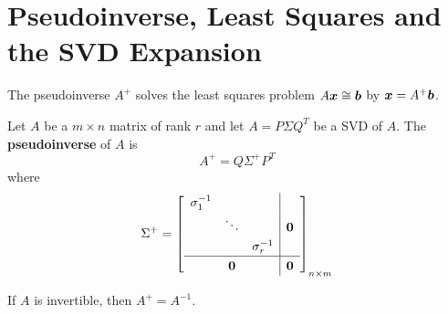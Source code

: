 \section{Pseudoinverse, Least Squares and the SVD Expansion}

\begin{bigidea}
The pseudoinverse $A^+$ solves the least squares problem $A \boldsymbol{x} \cong \boldsymbol{b}$ by $\boldsymbol{x} = A^+ \boldsymbol{b}$.
\end{bigidea}

\begin{definition}
Let $A$ be a $m \times n$ matrix of rank $r$ and let $A = P \Sigma Q^T$ be a SVD of $A$. The {\bf pseudoinverse} of $A$ \cite[p.458]{KN} is
$$
A^+ = Q \Sigma^+ P^T
$$
where
$$
\Sigma^+ =
\renewcommand{\arraystretch}{1.25}
\left[ \begin{array}{ccc|c}
\sigma_1^{-1} & & & \\
& \ddots & & \bs{0} \\
& & \sigma_r^{-1} & \\ \hline
& \bs{0} & & \bs{0}
\end{array} \right]_{n \times m}
\renewcommand{\arraystretch}{1}
$$
\end{definition}

\begin{note}
If $A$ is invertible, then $A^+ = A^{-1}$.
\end{note}

